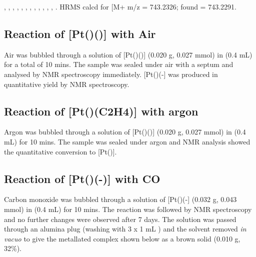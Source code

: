 ,
,
,
,
,
,
,
,
,
,
,
,
.
HRMS calcd for  [M+\ce{H]+} m/z = 743.2326; found = 743.2291.

\subsection*{Reaction of \texorpdfstring{[Pt(\tButhixantphos)()]} P with Air}
Air was bubbled through a solution of [Pt(\tButhixantphos)()] (0.020 g, 0.027 mmol) in  (0.4 mL) for a total of 10 mins.  The sample was sealed under air with a septum and analysed by NMR spectroscopy immediately.  [Pt(\tButhixantphos)(-] was produced in quantitative yield by NMR spectroscopy.  

\subsection*{Reaction of \texorpdfstring{[Pt(\tButhixantphos)(C2H4)]} P with argon}
Argon was bubbled through a solution of [Pt(\tButhixantphos)()] (0.020 g, 0.027 mmol) in  (0.4 mL) for 10 mins.  The sample was sealed under argon and NMR analysis showed the quantitative conversion to [Pt(\tButhixantphos)].  

\subsection*{Reaction of \texorpdfstring{[Pt(\tButhixantphos)(-)]} P with CO}

Carbon monoxide was bubbled through a solution of [Pt(\tButhixantphos)(-] (0.032 g, 0.043 mmol) in  (0.4 mL) for 10 mins.  The reaction was followed by NMR spectroscopy and no further changes were observed after 7 days.  The solution was passed through an alumina plug (washing with 3 x 1 mL ) and the solvent removed \emph{in vacuo} to give the metallated complex shown below as a brown solid (0.010 g, 32\%).  

